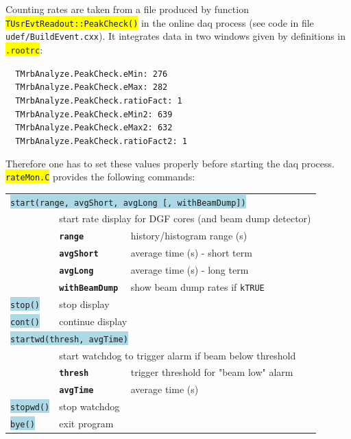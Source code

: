 \documentclass[10pt]{article}
\newcommand{\blue}[1]{\colorbox{lightblue}{\texttt{#1}}}
\newcommand{\yellow}[1]{\colorbox{yellow}{\texttt{#1}}}
\newcommand{\boldt}[1]{\textbf{\texttt{#1}}}
\newenvironment{blueboxed}
	{\begin{Sbox}\begin{minipage}[t]}
	{\end{minipage}\end{Sbox}\colorbox{lightblue}{\TheSbox}}
\begin{document}
Counting rates are taken from a file produced by function \yellow{TUsrEvtReadout::PeakCheck()} in the online daq process
(see code in file \texttt{udef/BuildEvent.cxx}). It integrates data in two windows given by definitions in \yellow{.rootrc}:

\begin{center}
\begin{blueboxed}{.75\linewidth}
\verb+	TMrbAnalyze.PeakCheck.eMin: 276+\\
\verb+	TMrbAnalyze.PeakCheck.eMax: 282+\\
\verb+	TMrbAnalyze.PeakCheck.ratioFact: 1+\\
\verb+	TMrbAnalyze.PeakCheck.eMin2: 639+\\
\verb+	TMrbAnalyze.PeakCheck.eMax2: 632+\\
\verb+	TMrbAnalyze.PeakCheck.ratioFact2: 1+
\end{blueboxed}
\end{center}

Therefore one has to set these values properly before starting the daq process.\\

\yellow{rateMon.C} provides the following commands:
\begin{center}
\begin{tabular}{llll}
\multicolumn{4}{l}{\blue{start(range, avgShort, avgLong [, withBeamDump])}}\\
	&	\multicolumn{3}{l}{start rate display for DGF cores (and beam dump detector)}\\
	&	\boldt{range}	&	history/histogram range (s)\\
	&	\boldt{avgShort}	&	average time (s) - short term\\
	&	\boldt{avgLong}	&	average time (s) - long term\\
	&	\boldt{withBeamDump}	&	show beam dump rates if \texttt{kTRUE}\\
\blue{stop()}	&	\multicolumn{3}{l}{stop display}\\
\blue{cont()}	&	\multicolumn{3}{l}{continue display}\\
\multicolumn{4}{l}{\blue{startwd(thresh, avgTime)}}\\
	&	\multicolumn{3}{l}{start watchdog to trigger alarm if beam below threshold}\\
	&	\boldt{thresh}	&	trigger threshold for "beam low" alarm\\
	&	\boldt{avgTime}	&	average time (s)\\
\blue{stopwd()}	&	\multicolumn{3}{l}{stop watchdog}\\
\blue{bye()}	&	\multicolumn{3}{l}{exit program}\\
\end{tabular}
\end{center}
\end{document}
